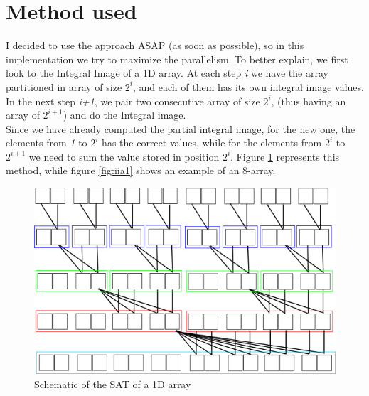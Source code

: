  \section{Method used}
 I decided to use the approach ASAP (as soon as possible), so in this implementation we try to maximize the parallelism.
 To better explain, we first look to the Integral Image of a 1D array.
 At each step \textit{i} we have the array  partitioned in array of size $ 2^{i} $, and each of them has its own integral image values.\\
 In the next step \textit{i+1}, we pair two consecutive array of size $ 2^{i} $, (thus having an array of $ 2^{i+1} $) and do the Integral image. \\Since we have already computed the partial integral image, for the new one, the elements from \textit{1} to $ 2^{i} $ has the correct values, while for the elements from $ 2^{i} $ to $ 2^{i+1} $ we need to sum the value stored in position $2^{i} $.
 Figure \ref{fig:iia0} represents this method, while figure \ref{fig:iia1} shows an example of an 8-array.
 
   	\begin{figure}[h]
   		\centering
   		\includegraphics[width=\textwidth]{imm/iia/iia00.png}  
   		\caption{Schematic of the SAT of a 1D array}
   		\label{fig:iia0}
   	\end{figure}
   	
